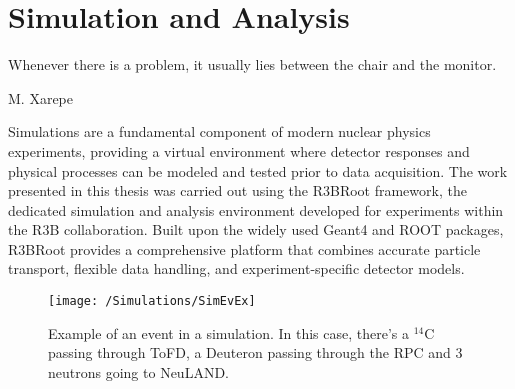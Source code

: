 
%

\chapter{Simulation and Analysis}
\label{cha:simulations}

\epigraph{
	Whenever there is a problem, it usually lies between the chair and the monitor.
}{M. Xarepe}

Simulations are a fundamental component of modern nuclear physics experiments, providing a virtual environment where detector responses and physical processes can be modeled and tested prior to data acquisition. The work presented in this thesis was carried out using the R3BRoot framework, the dedicated simulation and analysis environment developed for experiments within the \gls{R3B} collaboration. Built upon the widely used Geant4 and ROOT packages, R3BRoot provides a comprehensive platform that combines accurate particle transport, flexible data handling, and experiment-specific detector models.

\begin{figure}
	\centering
	\texttt{[image: /Simulations/SimEvEx]}
	\caption[Example of a simulated event]{Example of an event in a simulation. In this case, there's a $^{14}$C passing through \gls{ToFD}, a Deuteron passing through the \gls{RPC} and 3 neutrons going to NeuLAND.}
	\label{fig:Simulation}
\end{figure}




